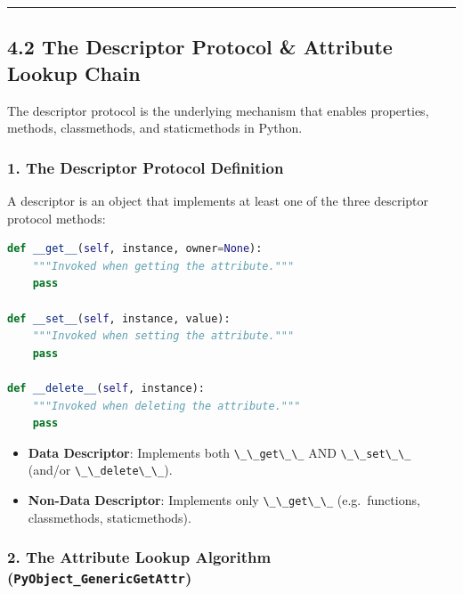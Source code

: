 \begin{center}\rule{0.5\linewidth}{0.5pt}\end{center}

\hypertarget{the-descriptor-protocol-attribute-lookup-chain}{%
\subsection{4.2 The Descriptor Protocol \& Attribute Lookup
Chain}\label{the-descriptor-protocol-attribute-lookup-chain}}

The descriptor protocol is the underlying mechanism that enables
properties, methods, classmethods, and staticmethods in Python.

\hypertarget{the-descriptor-protocol-definition}{%
\subsubsection{1. The Descriptor Protocol
Definition}\label{the-descriptor-protocol-definition}}

A descriptor is an object that implements at least one of the three
descriptor protocol methods:

\begin{lstlisting}[language=Python]
def __get__(self, instance, owner=None):
    """Invoked when getting the attribute."""
    pass

def __set__(self, instance, value):
    """Invoked when setting the attribute."""
    pass

def __delete__(self, instance):
    """Invoked when deleting the attribute."""
    pass
\end{lstlisting}

\begin{itemize}
\tightlist
\item
  \textbf{Data Descriptor}: Implements both
  \passthrough{\lstinline!\_\_get\_\_!} AND
  \passthrough{\lstinline!\_\_set\_\_!} (and/or
  \passthrough{\lstinline!\_\_delete\_\_!}).
\item
  \textbf{Non-Data Descriptor}: Implements only
  \passthrough{\lstinline!\_\_get\_\_!} (e.g.~functions, classmethods,
  staticmethods).
\end{itemize}

\hypertarget{the-attribute-lookup-algorithm-pyobject_genericgetattr}{%
\subsubsection{\texorpdfstring{2. The Attribute Lookup Algorithm
(\texttt{PyObject\_GenericGetAttr})}{2. The Attribute Lookup Algorithm (PyObject\_GenericGetAttr)}}\label{the-attribute-lookup-algorithm-pyobject_genericgetattr}}

